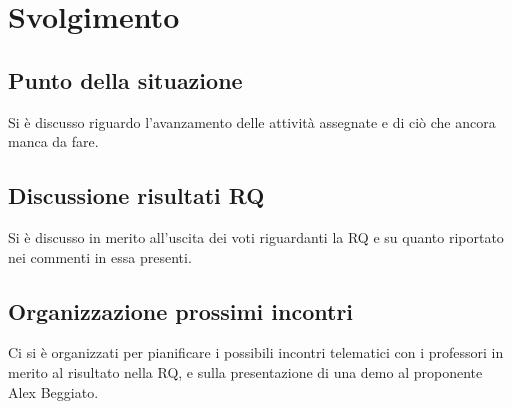 \newpage
\section*{Svolgimento}

	\subsection*{Punto della situazione}
		Si è discusso riguardo l'avanzamento delle attività assegnate e di ciò che ancora manca da fare.

	\subsection*{Discussione risultati RQ}
		Si è discusso in merito all'uscita dei voti riguardanti la RQ e su quanto riportato nei commenti in essa presenti.

	\subsection*{Organizzazione prossimi incontri}
		Ci si è organizzati per pianificare i possibili incontri telematici con i professori in merito al risultato nella RQ, e sulla presentazione di una demo al proponente Alex Beggiato.
